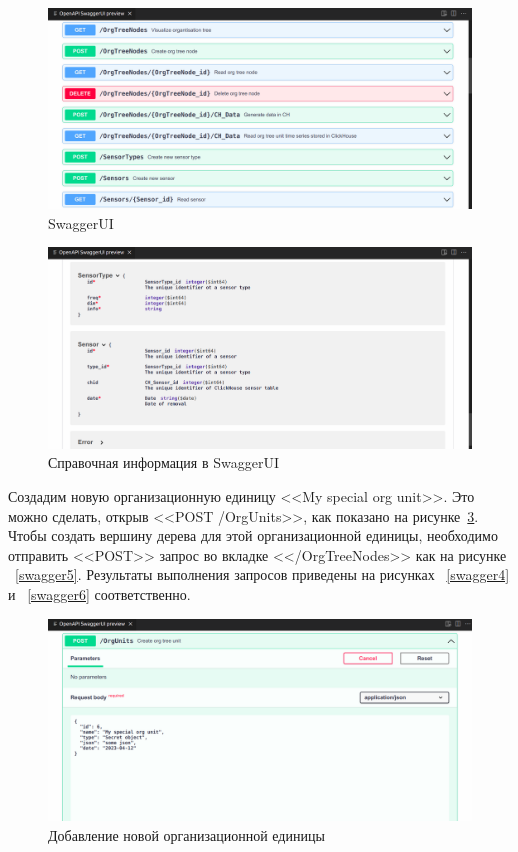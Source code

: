 \begin{figure}
    \includegraphics[scale=0.2]{../img/swagger1.png}
    \caption{SwaggerUI}
    \label{swagger1}
\end{figure}

\begin{figure}
    \includegraphics[scale=0.2]{../img/swagger2.png}
    \caption{Справочная информация в SwaggerUI}
    \label{swagger2}
\end{figure}

Создадим новую организационную единицу <<My special org unit>>. Это можно сделать, открыв <<POST /OrgUnits>>, как показано на рисунке~\ref{swagger3}. Чтобы создать вершину дерева для этой организационной единицы, необходимо отправить <<POST>> запрос во вкладке <</OrgTreeNodes>> как на рисунке ~\ref{swagger5}. Результаты выполнения запросов приведены на рисунках ~\ref{swagger4} и ~\ref{swagger6} соответственно.

\begin{figure}
    \includegraphics[scale=0.2]{../img/swagger3.png}
    \caption{Добавление новой организационной единицы}
    \label{swagger3}
\end{figure}

